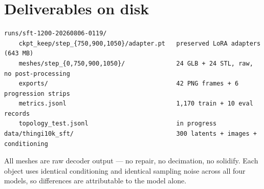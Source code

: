 \documentclass[11pt,a4paper]{article}
\begin{document}
\section{Deliverables on disk}
\begin{Verbatim}[fontsize=\small,frame=leftline,framerule=1pt,xleftmargin=8pt]
runs/sft-1200-20260806-0119/
    ckpt_keep/step_{750,900,1050}/adapter.pt   preserved LoRA adapters (643 MB)
    meshes/step_{0,750,900,1050}/              24 GLB + 24 STL, raw, no post-processing
    exports/                                   42 PNG frames + 6 progression strips
    metrics.jsonl                              1,170 train + 10 eval records
    topology_test.jsonl                        in progress
data/thingi10k_sft/                            300 latents + images + conditioning
\end{Verbatim}
{\small All meshes are raw decoder output --- no repair, no decimation, no solidify. Each object
uses identical conditioning and identical sampling noise across all four models, so differences are
attributable to the model alone.}
\end{document}
